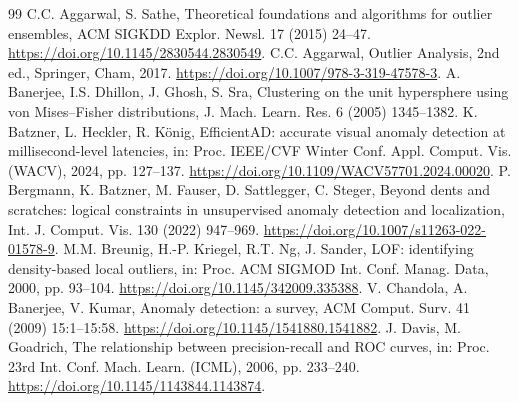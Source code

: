 \documentclass[preprint,review,12pt]{elsarticle}
\begin{document}
\begin{table}[h]
\caption{G3 lattice-size runs (excluded from inference): worst-type AP of four fused rules and time per lattice.}
\label{tab:g3size}
\centering\footnotesize
{}
\end{table}

\begin{thebibliography}{99}
 C.C. Aggarwal, S. Sathe, Theoretical foundations and algorithms for outlier ensembles, ACM SIGKDD Explor. Newsl. 17 (2015) 24--47. \url{https://doi.org/10.1145/2830544.2830549}.
 C.C. Aggarwal, Outlier Analysis, 2nd ed., Springer, Cham, 2017. \url{https://doi.org/10.1007/978-3-319-47578-3}.
 A. Banerjee, I.S. Dhillon, J. Ghosh, S. Sra, Clustering on the unit hypersphere using von Mises--Fisher distributions, J. Mach. Learn. Res. 6 (2005) 1345--1382.
 K. Batzner, L. Heckler, R. K{\"o}nig, EfficientAD: accurate visual anomaly detection at millisecond-level latencies, in: Proc. IEEE/CVF Winter Conf. Appl. Comput. Vis. (WACV), 2024, pp. 127--137. \url{https://doi.org/10.1109/WACV57701.2024.00020}.
 P. Bergmann, K. Batzner, M. Fauser, D. Sattlegger, C. Steger, Beyond dents and scratches: logical constraints in unsupervised anomaly detection and localization, Int. J. Comput. Vis. 130 (2022) 947--969. \url{https://doi.org/10.1007/s11263-022-01578-9}.
 M.M. Breunig, H.-P. Kriegel, R.T. Ng, J. Sander, LOF: identifying density-based local outliers, in: Proc. ACM SIGMOD Int. Conf. Manag. Data, 2000, pp. 93--104. \url{https://doi.org/10.1145/342009.335388}.
 V. Chandola, A. Banerjee, V. Kumar, Anomaly detection: a survey, ACM Comput. Surv. 41 (2009) 15:1--15:58. \url{https://doi.org/10.1145/1541880.1541882}.
 J. Davis, M. Goadrich, The relationship between precision-recall and ROC curves, in: Proc. 23rd Int. Conf. Mach. Learn. (ICML), 2006, pp. 233--240. \url{https://doi.org/10.1145/1143844.1143874}.

\end{thebibliography}
\end{document}
